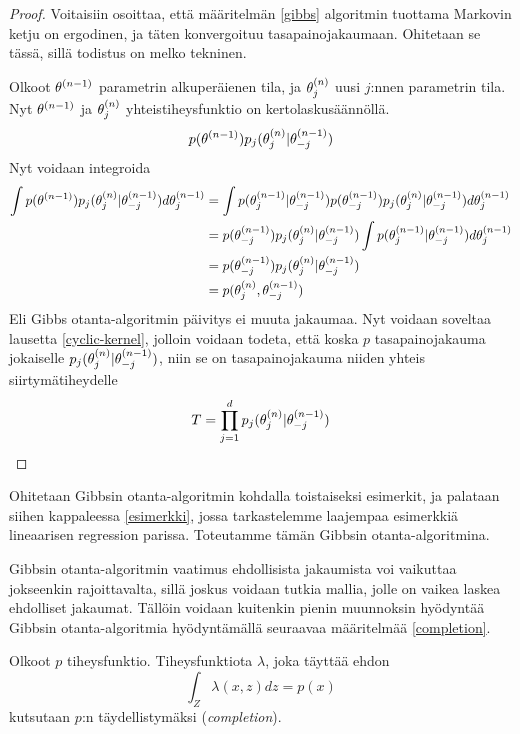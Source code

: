\begin{proof}
	Voitaisiin osoittaa, että määritelmän \ref{gibbs} algoritmin tuottama Markovin ketju on ergodinen, ja täten konvergoituu tasapainojakaumaan. Ohitetaan se tässä, sillä todistus on melko tekninen.
	
	Olkoot $\theta^{(n-1)}$ parametrin alkuperäienen tila, ja $\theta^{(n)}_j$ uusi $j$:nnen parametrin tila. Nyt $\theta^{(n-1)}$ ja $\theta^{(n)}_j$ yhteistiheysfunktio on kertolaskusäännöllä.
	\begin{equation}
		p(\theta^{(n-1)})p_j(\theta^{(n)}_j|\theta^{(n-1)}_{-j})
	\end{equation}
	Nyt voidaan integroida
	\begin{equation}
		\begin{split}
			\int p(\theta^{(n-1)})p_j(\theta^{(n)}_j|\theta^{(n-1)}_{-j}) d\theta^{(n-1)}_j &= \int p(\theta^{(n-1)}_j|\theta^{(n-1)}_{-j})p(\theta^{(n-1)}_{-j})p_j(\theta^{(n)}_j|\theta^{(n-1)}_{-j}) d\theta^{(n-1)}_j \\
			&= p(\theta^{(n-1)}_{-j})p_j(\theta^{(n)}_j|\theta^{(n-1)}_{-j}) \int p(\theta^{(n-1)}_j|\theta^{(n-1)}_{-j}) d\theta^{(n-1)}_j \\
			&= p(\theta^{(n-1)}_{-j})p_j(\theta^{(n)}_j|\theta^{(n-1)}_{-j}) \\
			&= p(\theta^{(n)}_j,\theta^{(n-1)}_{-j})
		\end{split}
	\end{equation}
	Eli Gibbs otanta-algoritmin päivitys ei muuta jakaumaa. Nyt voidaan soveltaa lausetta \ref{cyclic-kernel}, jolloin voidaan todeta, että koska $p$ tasapainojakauma jokaiselle $p_j(\theta^{(n)}_j|\theta^{(n-1)}_{-j})$, niin se on tasapainojakauma niiden yhteis siirtymätiheydelle
	\begin{equation}
		T = \prod_{j=1}^{d} p_j(\theta^{(n)}_j|\theta^{(n-1)}_{-j})
	\end{equation}

\end{proof}

Ohitetaan Gibbsin otanta-algoritmin kohdalla toistaiseksi esimerkit, ja palataan siihen kappaleessa \ref{esimerkki}, jossa tarkastelemme laajempaa esimerkkiä lineaarisen regression parissa. Toteutamme tämän Gibbsin otanta-algoritmina.

Gibbsin otanta-algoritmin vaatimus ehdollisista jakaumista voi vaikuttaa jokseenkin rajoittavalta, sillä joskus voidaan tutkia mallia, jolle on vaikea laskea ehdolliset jakaumat. Tällöin voidaan kuitenkin pienin muunnoksin hyödyntää Gibbsin otanta-algoritmia hyödyntämällä seuraavaa määritelmää \ref{completion}. \cite[s.~374]{monte_carlo_book} 

\begin{maar}\label{completion}
	Olkoot $p$ tiheysfunktio. Tiheysfunktiota $\lambda$, joka täyttää ehdon
	\begin{equation}
		\int_Z \lambda(x,z) dz = p(x)
	\end{equation}
	kutsutaan $p$:n täydellistymäksi (\textit{completion}).
\end{maar}

